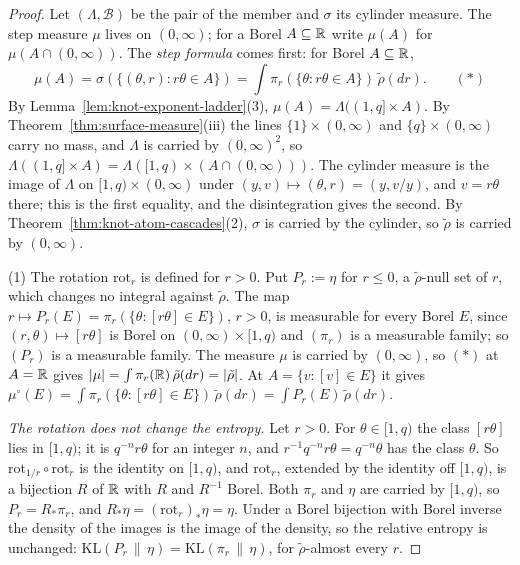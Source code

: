 \begin{proof}
\leanok
{}
Let $(\Lambda, \mathcal{B})$ be the pair of the member and $\sigma$ its cylinder measure. The step
measure $\mu$ lives on $(0,\infty)$; for a Borel $A \subseteq \mathbb{R}$ write $\mu(A)$ for
$\mu(A \cap (0,\infty))$. The \emph{step formula} comes first: for Borel $A \subseteq \mathbb{R}$,
\[
  \mu(A) = \sigma(\{(\theta, r) : r\theta \in A\}) = \int\pi_r(\{\theta : r\theta \in A\})\,\tilde\rho(dr).
  \qquad (*)
\]
By Lemma~\ref{lem:knot-exponent-ladder}(3), $\mu(A) = \Lambda((1,q] \times A)$. By
Theorem~\ref{thm:surface-measure}(iii) the lines $\{1\} \times (0,\infty)$ and
$\{q\} \times (0,\infty)$ carry no mass, and $\Lambda$ is carried by $(0,\infty)^2$, so
$\Lambda((1,q] \times A) = \Lambda([1,q) \times (A \cap (0,\infty)))$. The cylinder measure is the
image of $\Lambda$ on $[1,q) \times (0,\infty)$ under $(y, v) \mapsto (\theta, r) = (y, v/y)$, and
$v = r\theta$ there; this is the first equality, and the disintegration gives the second. By
Theorem~\ref{thm:knot-atom-cascades}(2), $\sigma$ is carried by the cylinder, so $\tilde\rho$ is
carried by $(0,\infty)$.

(1) The rotation $\mathrm{rot}_r$ is defined for $r > 0$. Put $P_r := \eta$ for $r \le 0$, a
$\tilde\rho$-null set of $r$, which changes no integral against $\tilde\rho$. The map
$r \mapsto P_r(E) = \pi_r(\{\theta : [r\theta] \in E\})$, $r > 0$, is measurable for every Borel
$E$, since $(r, \theta) \mapsto [r\theta]$ is Borel on $(0,\infty) \times [1,q)$ and $(\pi_r)$ is a
measurable family; so $(P_r)$ is a measurable family. The measure $\mu$ is carried by $(0,\infty)$,
so $(*)$ at $A = \mathbb{R}$ gives $|\mu| = \int\pi_r(\mathbb{R})\,\tilde\rho(dr) = |\tilde\rho|$. At
$A = \{v : [v] \in E\}$ it gives
$\mu^\circ(E) = \int\pi_r(\{\theta : [r\theta] \in E\})\,\tilde\rho(dr) = \int P_r(E)\,\tilde\rho(dr)$.

\emph{The rotation does not change the entropy.} Let $r > 0$. For $\theta \in [1,q)$ the class
$[r\theta]$ lies in $[1,q)$; it is $q^{-n}r\theta$ for an integer $n$, and $r^{-1}q^{-n}r\theta = q^{-n}\theta$
has the class $\theta$. So $\mathrm{rot}_{1/r} \circ \mathrm{rot}_r$ is the identity on $[1,q)$,
and $\mathrm{rot}_r$, extended by the identity off $[1,q)$, is a bijection $R$ of $\mathbb{R}$ with $R$ and
$R^{-1}$ Borel. Both $\pi_r$ and $\eta$ are carried by $[1,q)$, so $P_r = R_*\pi_r$, and
$R_*\eta = (\mathrm{rot}_r)_*\eta = \eta$. Under a Borel bijection with Borel inverse the density
of the images is the image of the density, so the relative entropy is unchanged:
$\mathrm{KL}(P_r \,\|\, \eta) = \mathrm{KL}(\pi_r \,\|\, \eta)$, for $\tilde\rho$-almost every $r$.


\end{proof}
